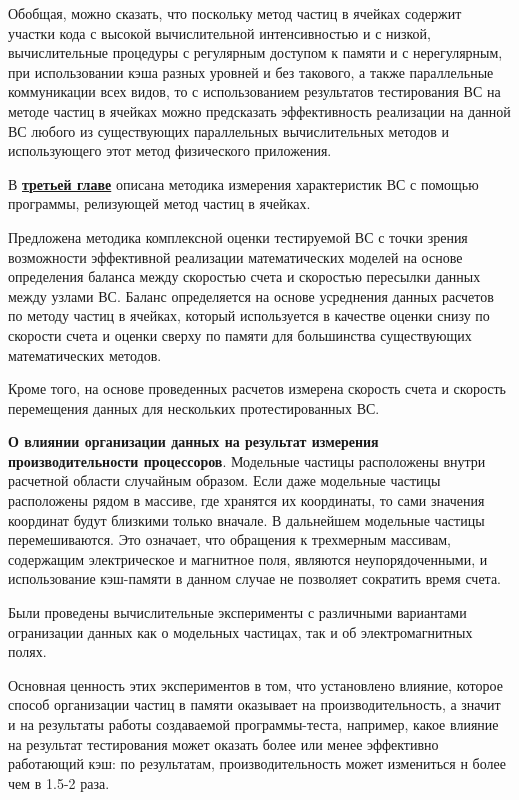 Обобщая, можно сказать, что поскольку метод частиц в ячейках содержит участки кода с высокой вычислительной интенсивностью и с низкой, вычислительные процедуры с регулярным доступом к памяти и с нерегулярным, при использовании кэша разных уровней и без такового, а также параллельные коммуникации всех видов, то с использованием результатов тестирования ВС на методе частиц в ячейках можно предсказать эффективность реализации на данной ВС любого из существующих параллельных вычислительных методов и использующего этот метод физического приложения.

В \underline{\textbf{третьей главе}} описана методика измерения характеристик ВС с помощью программы, релизующей метод частиц в ячейках. 

Предложена методика комплексной оценки тестируемой ВС с точки зрения возможности эффективной реализации математических моделей на основе определения баланса между скоростью счета и скоростью пересылки данных между узлами ВС. Баланс определяется на основе усреднения данных расчетов по методу частиц в ячейках, который используется в качестве оценки снизу по скорости счета и оценки сверху по памяти для большинства существующих математических методов.

Кроме того, на основе проведенных расчетов измерена скорость счета и скорость перемещения данных для нескольких протестированных ВС.

\textbf{О влиянии организации данных на результат измерения производительности процессоров}.
Модельные частицы расположены внутри расчетной области случайным образом. Если даже модельные частицы расположены рядом в массиве, где хранятся их координаты,  то сами значения координат будут близкими только вначале. В дальнейшем модельные частицы перемешиваются. Это означает, что обращения к трехмерным массивам, содержащим электрическое и магнитное поля, являются неупорядоченными,  и использование кэш-памяти в данном случае не позволяет сократить время счета. 

Были проведены вычислительные эксперименты с различными вариантами огранизации данных как о модельных частицах, так и об электромагнитных полях.

Основная ценность этих экспериментов в том, что установлено влияние, которое способ организации частиц в памяти оказывает на производительность, а значит и на результаты работы создаваемой программы-теста, например, какое влияние на результат тестирования может оказать более или менее эффективно работающий кэш: по результатам, производительность может измениться н более чем в 1.5-2 раза.

